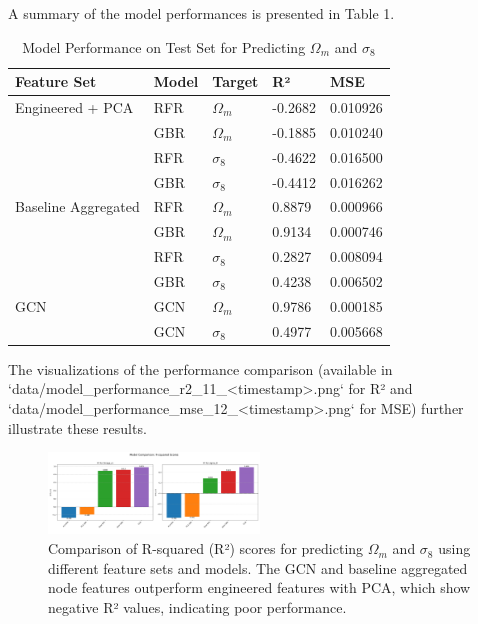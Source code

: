 \documentclass[twocolumn]{aastex631}
\begin{document}
A summary of the model performances is presented in Table 1.

\begin{table}[h!]
\centering
\caption{Model Performance on Test Set for Predicting $\Omega_m$ and $\sigma_8$}
\begin{tabular}{|l|l|l|l|l|}
\hline
Feature Set             & Model & Target    & R²      & MSE        \\ \hline
Engineered + PCA    & RFR   & $\Omega_m$  & -0.2682 & 0.010926   \\ \hline
                        & GBR   & $\Omega_m$  & -0.1885 & 0.010240   \\ \hline
                        & RFR   & $\sigma_8$  & -0.4622 & 0.016500   \\ \hline
                        & GBR   & $\sigma_8$  & -0.4412 & 0.016262   \\ \hline
Baseline Aggregated & RFR   & $\Omega_m$  & 0.8879  & 0.000966   \\ \hline
                        & GBR   & $\Omega_m$  & 0.9134  & 0.000746   \\ \hline
                        & RFR   & $\sigma_8$  & 0.2827  & 0.008094   \\ \hline
                        & GBR   & $\sigma_8$  & 0.4238  & 0.006502   \\ \hline
GCN                     & GCN   & $\Omega_m$  & 0.9786  & 0.000185   \\ \hline
                        & GCN   & $\sigma_8$  & 0.4977  & 0.005668   \\ \hline
\end{tabular}
\label{tab:model_performance}
\end{table}

The visualizations of the performance comparison (available in `data/model\_performance\_r2\_11_<timestamp>.png` for R² and `data/model\_performance\_mse\_12_<timestamp>.png` for MSE) further illustrate these results.

\begin{figure}[h!]
    \centering
    \includegraphics[width=0.5\textwidth]{../input_files/plots/model_performance_r2_11_20250527-135752.png}
    \caption{Comparison of R-squared (R²) scores for predicting $\Omega_m$ and $\sigma_8$ using different feature sets and models. The GCN and baseline aggregated node features outperform engineered features with PCA, which show negative R² values, indicating poor performance.}
    \label{fig:model_performance_r2}
\end{figure}
\end{document}
